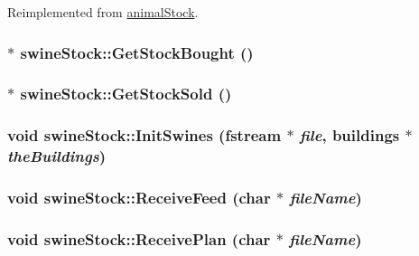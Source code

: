Reimplemented from \hyperlink{classanimal_stock_ac12cce9260301cb684af03c4d101d3ca}{animalStock}.\hypertarget{classswine_stock_a5ef49c2bbc4df37f13cec1d1d452ea3a}{
\subsubsection[{GetStockBought}]{ $\ast$ swineStock::GetStockBought ()}}
\label{classswine_stock_a5ef49c2bbc4df37f13cec1d1d452ea3a}
\hypertarget{classswine_stock_a84a354508bd5989c1d8fe53209292f63}{
\subsubsection[{GetStockSold}]{ $\ast$ swineStock::GetStockSold ()}}
\label{classswine_stock_a84a354508bd5989c1d8fe53209292f63}
\hypertarget{classswine_stock_a53e9eabc6dbdd5b9a95d8aef104b3152}{
\subsubsection[{InitSwines}]{\setlength{\rightskip}{0pt plus 5cm}void swineStock::InitSwines (fstream $\ast$ {\em file}, \/  {\bf buildings} $\ast$ {\em theBuildings})}}
\label{classswine_stock_a53e9eabc6dbdd5b9a95d8aef104b3152}
\hypertarget{classswine_stock_ae8818ed344f35b8decfb6ab9d1719952}{
\subsubsection[{ReceiveFeed}]{\setlength{\rightskip}{0pt plus 5cm}void swineStock::ReceiveFeed (char $\ast$ {\em fileName})}}
\label{classswine_stock_ae8818ed344f35b8decfb6ab9d1719952}
\hypertarget{classswine_stock_acf5744db1aac193ee2af257c4554918d}{
\subsubsection[{ReceivePlan}]{\setlength{\rightskip}{0pt plus 5cm}void swineStock::ReceivePlan (char $\ast$ {\em fileName})}}
\label{classswine_stock_acf5744db1aac193ee2af257c4554918d}


